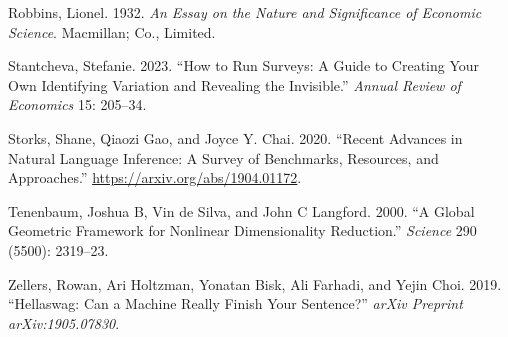 \documentclass[
]{article}
\newlength{\cslhangindent}
\newlength{\cslentryspacingunit} %
\newenvironment{CSLReferences}[2] %
 {%
  \setlength{\parindent}{0pt}
  \ifodd #1
  \let\oldpar\par
  \def\par{\hangindent=\cslhangindent\oldpar}
  \fi
  \setlength{\parskip}{#2\cslentryspacingunit}
 }%
 {}
\begin{document}
\begin{CSLReferences}{1}{0}
\leavevmode{}%
Robbins, Lionel. 1932. \emph{An Essay on the Nature and Significance of
Economic Science}. Macmillan; Co., Limited.

\leavevmode{}%
Stantcheva, Stefanie. 2023. {``How to Run Surveys: A Guide to Creating
Your Own Identifying Variation and Revealing the Invisible.''}
\emph{Annual Review of Economics} 15: 205--34.

\leavevmode{}%
Storks, Shane, Qiaozi Gao, and Joyce Y. Chai. 2020. {``Recent Advances
in Natural Language Inference: A Survey of Benchmarks, Resources, and
Approaches.''} \url{https://arxiv.org/abs/1904.01172}.

\leavevmode{}%
Tenenbaum, Joshua B, Vin de Silva, and John C Langford. 2000. {``A
Global Geometric Framework for Nonlinear Dimensionality Reduction.''}
\emph{Science} 290 (5500): 2319--23.

\leavevmode{}%
Zellers, Rowan, Ari Holtzman, Yonatan Bisk, Ali Farhadi, and Yejin Choi.
2019. {``Hellaswag: Can a Machine Really Finish Your Sentence?''}
\emph{arXiv Preprint arXiv:1905.07830}.

\end{CSLReferences}
\end{document}
